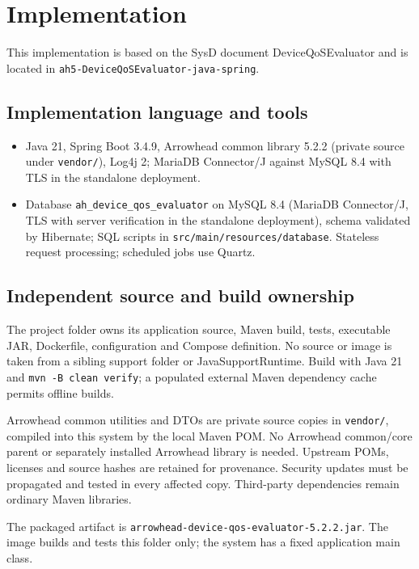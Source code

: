 \documentclass[a4paper]{arrowhead}
\begin{document}
\section{Implementation}
\label{Implementation}

This implementation is based on the SysD document DeviceQoSEvaluator \cite{dqe-sysd} and is located in \texttt{ah5-DeviceQoSEvaluator-java-spring}.

\subsection{Implementation language and tools}
\begin{itemize}
\item Java 21, Spring Boot 3.4.9, Arrowhead common library 5.2.2 (private source under \texttt{vendor/}), Log4j 2; MariaDB Connector/J against MySQL 8.4 with TLS in the standalone deployment.
\item Database \texttt{ah\_\allowbreak{}device\_\allowbreak{}qos\_\allowbreak{}evaluator} on MySQL 8.4 (MariaDB Connector/J, TLS with server verification in the standalone deployment), schema validated by Hibernate; SQL scripts in \texttt{src/\allowbreak{}main/\allowbreak{}resources/\allowbreak{}database}. Stateless request processing; scheduled jobs use Quartz.
\end{itemize}

\subsection{Independent source and build ownership}
The project folder owns its application source, Maven build, tests, executable JAR, Dockerfile, configuration and Compose definition. No source or image is taken from a sibling support folder or JavaSupportRuntime. Build with Java 21 and \texttt{mvn -B clean verify}; a populated external Maven dependency cache permits offline builds.

Arrowhead common utilities and DTOs are private source copies in \texttt{vendor/}, compiled into this system by the local Maven POM. No Arrowhead common/core parent or separately installed Arrowhead library is needed. Upstream POMs, licenses and source hashes are retained for provenance. Security updates must be propagated and tested in every affected copy. Third-party dependencies remain ordinary Maven libraries.

The packaged artifact is \texttt{arrowhead-\allowbreak{}device-\allowbreak{}qos-\allowbreak{}evaluator-5.2.2.jar}. The image builds and tests this folder only; the system has a fixed application main class.
\end{document}
